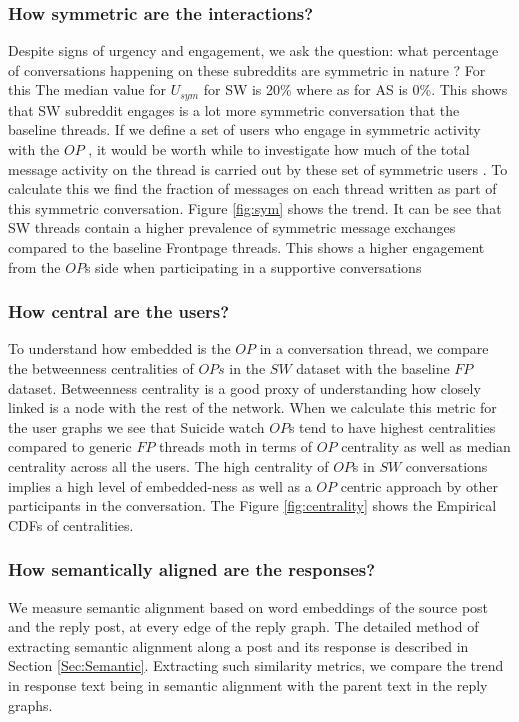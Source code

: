 \subsubsection{How symmetric are the interactions?}
Despite signs of urgency and engagement, we ask the question: what percentage of conversations happening on these subreddits are symmetric in nature ? 
For this The median value for $U_{sym}$ for SW is 20\% where as for AS is 0\%. This shows that SW subreddit engages is a lot more symmetric conversation that the baseline threads.
If we define a set of users who engage in symmetric activity with the $OP$ , it would be worth while to investigate how much of the total message activity on the thread is carried out by these set of symmetric users . To calculate this we find the fraction of messages on each thread written as part of this symmetric conversation. Figure \ref{fig:sym} shows the trend. It can be see that SW threads contain a higher prevalence of symmetric message exchanges compared to the baseline Frontpage threads. This shows a higher engagement from the $OP$s side when participating in a supportive conversations

\subsubsection{How central are the users?}
To understand how embedded is the $OP$ in a conversation thread, we compare the betweenness centralities of $OPs$ in the $SW$ dataset with the baseline $FP$ dataset. 
Betweenness centrality is a good proxy of understanding how closely linked is a node with the rest of the network. When we calculate this metric for the user graphs we see that Suicide watch $OP$s tend to have highest centralities compared to generic $FP$ threads moth in terms of $OP$ centrality as well as median centrality across all the users. The high centrality of $OP$s in $SW$ conversations implies a high level of embedded-ness as well as a $OP$ centric approach by other participants in the conversation. The Figure \ref{fig:centrality} shows the Empirical CDFs of centralities. 

\subsubsection{How semantically aligned are the responses?}
We measure semantic alignment based on word embeddings of the source post and the reply post, at every edge of the reply graph. The detailed method of extracting semantic alignment along a post and its response is described in Section \ref{Sec:Semantic}. Extracting such similarity metrics, we compare the trend in response text being in semantic alignment with the parent text in the reply graphs. 


